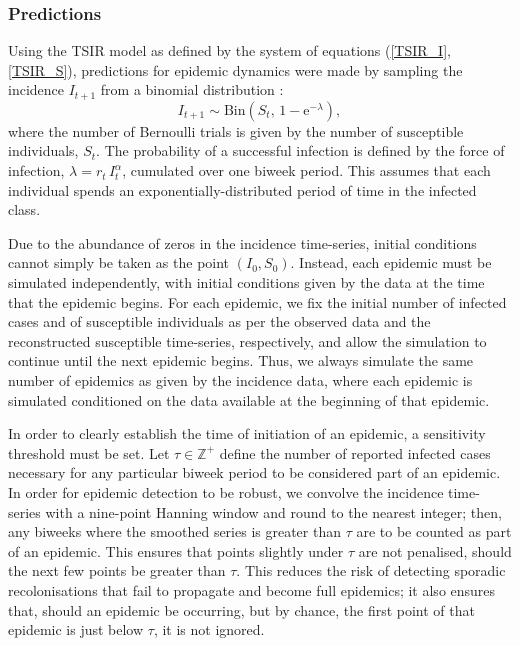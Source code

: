 \documentclass[10pt]{article}
\begin{document}
\subsubsection*{Predictions}

Using the TSIR model as defined by the system of equations (\ref{TSIR_I}, \ref{TSIR_S}), predictions for epidemic dynamics were made by sampling the incidence $I_{t+1}$ from a binomial distribution :
\begin{equation}
I_{t+1} \sim \mathrm{Bin}\left(S_t, \, 1-\mathrm{e}^{-\lambda}\right),
\end{equation}
where the number of Bernoulli trials is given by the number of susceptible individuals, $S_t$. The probability of a successful infection is defined by the force of infection, $\lambda = r_t\,I_t^\alpha$, cumulated over one biweek period. This assumes that each individual spends an exponentially-distributed period of time in the infected class.

Due to the abundance of zeros in the incidence time-series, initial conditions cannot simply be taken as the point $\left(I_0, S_0\right)$. Instead, each epidemic must be simulated independently, with initial conditions given by the data at the time that the epidemic begins. For each epidemic, we fix the initial number of infected cases and of susceptible individuals as per the observed data and the reconstructed susceptible time-series, respectively, and allow the simulation to continue until the next epidemic begins. Thus, we always simulate the same number of epidemics as given by the incidence data, where each epidemic is simulated conditioned on the data available at the beginning of that epidemic. 

In order to clearly establish the time of initiation of an epidemic, a sensitivity threshold must be set. Let $\tau \in \mathbb{Z}^+$ define the number of reported infected cases necessary for any particular biweek period to be considered part of an epidemic. In order for epidemic detection to be robust, we convolve the incidence time-series with a nine-point Hanning window and round to the nearest integer; then, any biweeks where the smoothed series is greater than $\tau$ are to be counted as part of an epidemic. This ensures that points slightly under $\tau$ are not penalised, should the next few points be greater than $\tau$. This reduces the risk of detecting sporadic recolonisations that fail to propagate and become full epidemics; it also ensures that, should an epidemic be occurring, but by chance, the first point of that epidemic is just below $\tau$, it is not ignored. 
\end{document}
